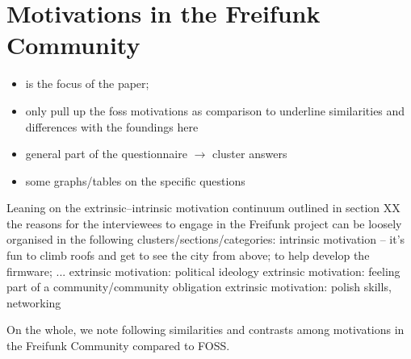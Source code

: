 \section{Motivations in the Freifunk Community}

\begin{itemize}
  \item is the focus of the paper;
  \item only pull up the foss motivations as comparison to underline similarities and differences with the foundings here
  \item general part of the questionnaire $\rightarrow$ cluster answers
  \item some graphs/tables on the specific questions
\end{itemize}

Leaning on the extrinsic--intrinsic motivation continuum outlined in section XX the reasons for the interviewees to engage in the Freifunk project can be loosely organised in the following clusters/sections/categories:
intrinsic motivation -- it's fun to climb roofs and get to see the city from above; to help develop the firmware; ...
extrinsic motivation: political ideology
extrinsic motivation: feeling part of a community/community obligation
extrinsic motivation: polish skills, networking

On the whole, we note following similarities and contrasts among motivations in the Freifunk Community compared to FOSS.




